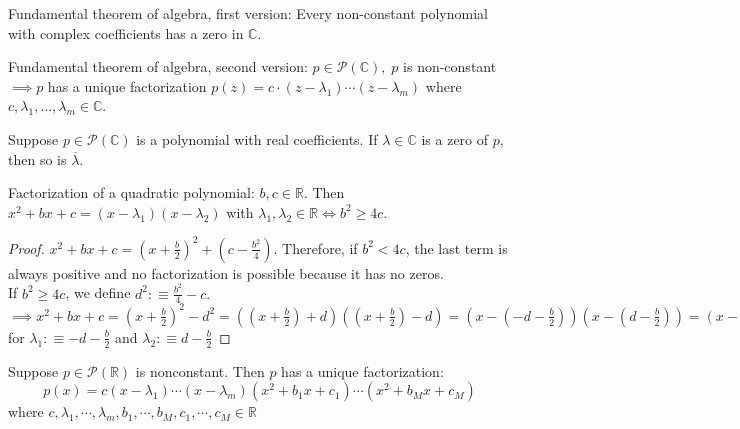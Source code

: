 \setcounter{thm}{11}
\begin{thm}
    \label{fundamental-theorem-of-algebra-first-version}
    Fundamental theorem of algebra, first version: Every non-constant polynomial with complex coefficients has a zero in $\mathbb{C}$.
\end{thm}

\begin{thm}
    \label{fundamental-theorem-of-algebra-second-version}
    Fundamental theorem of algebra, second version: $p \in \mathcal{P} (\mathbb{C}), \; p$ is non-constant $\implies p$ has a unique factorization $p(z)=c \cdot (z-\lambda_1) \cdots (z-\lambda_m)$ where $c, \lambda_1, \dots, \lambda_m \in \mathbb{C}$.
\end{thm}

\begin{thm}
    Suppose $p\in \mathcal{P} (\mathbb{C})$ is a polynomial with real coefficients. If $\lambda \in \mathbb{C}$ is a zero of $p$, then so is $\overline{\lambda}$.
\end{thm}

\begin{thm}
    Factorization of a quadratic polynomial:
    $b, c \in \mathbb{R}$. Then $x^2 + bx + c = (x-\lambda_1)(x-\lambda_2)$ with $\lambda_1, \lambda_2 \in \mathbb{R} \iff b^2 \geq 4c$.
\end{thm}
\begin{proof}
    $x^2+bx+c=(x+\frac{b}{2})^2+(c-\frac{b^2}{4})$. Therefore, if $b^2<4c$, the last term is always positive and no factorization is possible because it has no zeros. \\ 
    If $b^2 \geq 4c$, we define $d^2 :\equiv \frac{b^2}{4}-c.$ $\implies x^2+bx+c = \left (x+\frac{b}{2} \right )^2-d^2 = \left ( (x+\frac{b}{2}) +d \right) \left ( (x+\frac{b}{2}) - d \right) = \left (x-(-d -\frac{b}{2}) \right) \left (x-(d-\frac{b}{2})\right)=\left(x-\lambda_1 \right) \left(x-\lambda_2\right)$ for $\lambda_1 :\equiv -d-\frac{b}{2}$ and $\lambda_2 :\equiv d-\frac{b}{2}$
\end{proof}

\begin{thm}
    Suppose $p \in \mathcal{P}(\mathbb{R})$ is nonconstant. Then $p$ has a unique factorization:
\begin{equation}
p(x) = c(x-\lambda_1) \cdots (x-\lambda_m)(x^2+b_1x+c_1) \cdots (x^2+b_Mx+c_M)
\end{equation}
where $c, \lambda_1, \cdots, \lambda_m, b_1, \cdots, b_M, c_1, \cdots, c_M \in \mathbb{R}$
\end{thm}


